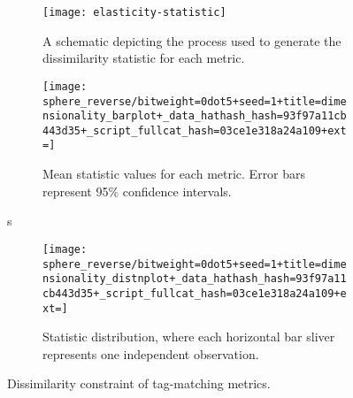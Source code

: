 \begin{figure}

\begin{center}
\begin{subfigure}[b]{\linewidth}
\begin{minipage}{0.5\linewidth}

\texttt{[image: elasticity-statistic]}

\end{minipage}
\begin{minipage}{0.5\linewidth}
\caption{
A schematic depicting the process used to generate the dissimilarity statistic for each metric.
}
\label{fig:dissimilarity_statistic}
\end{minipage}

\end{subfigure}

\begin{subfigure}[b]{\linewidth}
\begin{minipage}{0.6\linewidth}
\texttt{[image: sphere\_reverse/bitweight=0dot5+seed=1+title=dimensionality\_barplot+\_data\_hathash\_hash=93f97a11cb443d35+\_script\_fullcat\_hash=03ce1e318a24a109+ext=]}
\end{minipage}
\begin{minipage}{0.35\linewidth}
\caption{
Mean statistic values for each metric.
Error bars represent 95\% confidence intervals.
}
\label{fig:sphere_reverse_distnplot}
\end{minipage}
\end{subfigure}
s
\begin{subfigure}[b]{\columnwidth}
\centering
\texttt{[image: sphere\_reverse/bitweight=0dot5+seed=1+title=dimensionality\_distnplot+\_data\_hathash\_hash=93f97a11cb443d35+\_script\_fullcat\_hash=03ce1e318a24a109+ext=]}
\caption{
Statistic distribution, where each horizontal bar sliver represents one independent observation.
}
\label{fig:sphere_reverse_barplot}
\end{subfigure}

\caption{
Dissimilarity constraint of tag-matching metrics.
}
\label{fig:sphere_reverse}

\end{center}
\end{figure}
